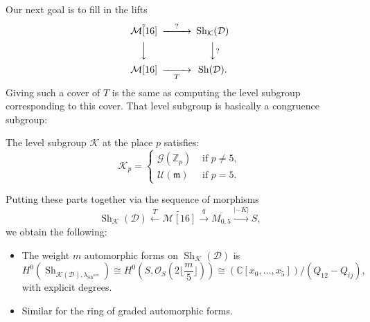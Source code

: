 \documentclass[reqno]{amsart} 
\begin{document}
Our next goal is to fill in the lifts
\begin{equation*}
  \begin{CD}         
    \tilde{\mathcal{M}[16]}  @>?>> \operatorname{Sh}_{\mathcal{K}}(\mathcal{D})\\
    @VVV  @VV?V \\
    \mathcal{M}[16] @>>T> \operatorname{Sh}(\mathcal{D}).\\
  \end{CD}
\end{equation*}
Giving such a cover of $T$ is the same as computing the level subgroup corresponding to this cover.  That level subgroup is basically a congruence subgroup:

\begin{proposition}
  The level subgroup $\mathcal{K}$ at the place $p$ satisfies:
  \begin{equation*}
    \mathcal{K}_p =
    \begin{cases}
      \mathcal{G}(\mathbb{Z}_p)      & \text{ if } p \neq 5, \\
      \mathcal{U}(\mathfrak{m})                                     & \text{ if } p = 5.
    \end{cases}
  \end{equation*}
\end{proposition}

Putting these parts together via the sequence of morphisms
\begin{equation*}
  \operatorname{Sh}_{\mathcal{K}}(\mathcal{D}) \xleftarrow{T} \tilde{\mathcal{M}[16]}
  \xrightarrow{q} \overline{M_{0, 5}}
  \xrightarrow{\lvert - K \rvert} S,
\end{equation*}
we obtain the following:
\begin{proposition}
  \begin{itemize}
  \item The weight $m$ automorphic forms on $\operatorname{Sh}_{\mathcal{K}}(\mathcal{D})$ is
    \begin{equation*}
      H^0(\operatorname{Sh}_{\mathcal{K}(\mathcal{D}), \lambda_{\mathrm{Sh}^{\otimes m}}})
      \cong H^0(S, \mathcal{O}_S(2 \lfloor \frac{m}{5} \rfloor))
      \cong \left( \mathbb{C}[x_0, \dotsc, x_5] \right) / (Q_{12} - Q_{i j}),
    \end{equation*}
    with explicit degrees.
  \item Similar for the ring of graded automorphic forms.
  \end{itemize}
\end{proposition}
\end{document}
